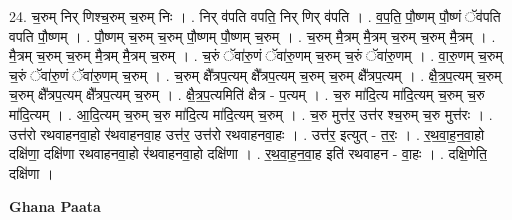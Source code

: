 \documentclass[17pt]{extarticle}
\begin{document}
24. च॒रुम् निर् णिश्च॒रुम् च॒रुम् निः । . निर् व॑पति वपति॒ निर् णिर् व॑पति । . व॒प॒ति॒ पौ॒ष्णम् पौ॒ष्णं ॅव॑पति वपति पौ॒ष्णम् । . पौ॒ष्णम् च॒रुम् च॒रुम् पौ॒ष्णम् पौ॒ष्णम् च॒रुम् । . च॒रुम् मै॒त्रम् मै॒त्रम् च॒रुम् च॒रुम् मै॒त्रम् । . मै॒त्रम् च॒रुम् च॒रुम् मै॒त्रम् मै॒त्रम् च॒रुम् । . च॒रुं ॅवा॑रु॒णं ॅवा॑रु॒णम् च॒रुम् च॒रुं ॅवा॑रु॒णम् । . वा॒रु॒णम् च॒रुम् च॒रुं ॅवा॑रु॒णं ॅवा॑रु॒णम् च॒रुम् । . च॒रुम् क्षै᳚त्रप॒त्यम् क्षै᳚त्रप॒त्यम् च॒रुम् च॒रुम् क्षै᳚त्रप॒त्यम् । . क्षै॒त्र॒प॒त्यम् च॒रुम् च॒रुम् क्षै᳚त्रप॒त्यम् क्षै᳚त्रप॒त्यम् च॒रुम् । . क्षै॒त्र॒प॒त्यमिति॑ क्षैत्र - प॒त्यम् । . च॒रु मा॑दि॒त्य मा॑दि॒त्यम् च॒रुम् च॒रु मा॑दि॒त्यम् । . आ॒दि॒त्यम् च॒रुम् च॒रु मा॑दि॒त्य मा॑दि॒त्यम् च॒रुम् । . च॒रु मुत्त॑र॒ उत्त॑र श्च॒रुम् च॒रु मुत्त॑रः । . उत्त॑रो रथवाहनवा॒हो र॑थवाहनवा॒ह उत्त॑र॒ उत्त॑रो रथवाहनवा॒हः । . उत्त॑र॒ इत्युत् - त॒रः॒ । . र॒थ॒वा॒ह॒न॒वा॒हो दक्षि॑णा॒ दक्षि॑णा रथवाहनवा॒हो र॑थवाहनवा॒हो दक्षि॑णा । . र॒थ॒वा॒ह॒न॒वा॒ह इति॑ रथवाहन - वा॒हः । . दक्षि॒णेति॒ दक्षि॑णा । \newline

\textbf{Ghana Paata } \newline
\end{document}
